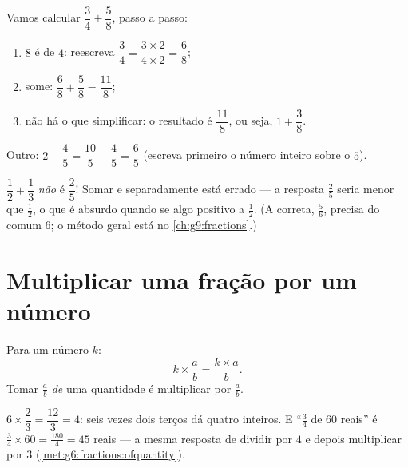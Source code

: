 \begin{example}\label{ex:g7:fractions:add}
Vamos calcular $\dfrac{3}{4} + \dfrac{5}{8}$, passo a passo:
\begin{enumerate}
  \item $8$ é  de $4$: reescreva
        $\dfrac34 = \dfrac{3 \times 2}{4 \times 2} = \dfrac{6}{8}$;
  \item some: $\dfrac{6}{8} + \dfrac{5}{8} = \dfrac{11}{8}$;
  \item não há o que simplificar: o resultado é $\dfrac{11}{8}$, ou
        seja, $1 + \dfrac38$.
\end{enumerate}
Outro: $2 - \dfrac{4}{5} = \dfrac{10}{5} - \dfrac{4}{5} =
\dfrac{6}{5}$ (escreva primeiro o número inteiro sobre o 
$5$).
\end{example}

\begin{example}\label{ex:g7:fractions:trap}
$\dfrac12 + \dfrac13$ \emph{não} é $\dfrac{2}{5}$! Somar  e
 separadamente está errado --- a resposta $\frac25$ seria
menor que $\frac12$, o que é absurdo quando se \emph{} algo
positivo a $\frac12$. (A  correta, $\frac56$, precisa do
 comum $6$; o método geral está no
\cref{ch:g9:fractions}.)
\end{example}

\section{Multiplicar uma fração por um número}

\begin{proposition}\label{prop:g7:fractions:mult}
Para um número $k$:
\[
k \times \frac{a}{b} = \frac{k \times a}{b} .
\]
Tomar $\frac ab$ \emph{de} uma quantidade é multiplicar por
$\frac ab$.
\end{proposition}
\admitted

\begin{example}\label{ex:g7:fractions:mult}
$6 \times \dfrac{2}{3} = \dfrac{12}{3} = 4$: seis vezes dois terços dá
quatro inteiros. E ``$\frac34$ de $60$ reais'' é
$\frac34 \times 60 = \frac{180}{4} = 45$ reais --- a mesma resposta de
dividir por $4$ e depois multiplicar por $3$
(\cref{met:g6:fractions:ofquantity}).
\end{example}

